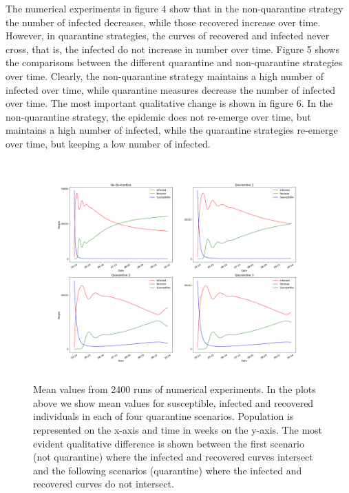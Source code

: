 \documentclass[11pt,a4paper,reqno]{amsart}
\theoremstyle{definition}
\theoremstyle{remark}
\begin{document}
The numerical experiments in figure 4 show that in the non-quarantine strategy the number of infected decreases, while those recovered increase over time. However, in quarantine strategies, the curves of recovered and infected never cross, that is, the infected do not increase in number over time. Figure 5 shows the comparisons between the different quarantine and non-quarantine strategies over time. Clearly, the non-quarantine strategy maintains a high number of infected over time, while quarantine measures decrease the number of infected over time. The most important qualitative change is shown in figure 6. In the non-quarantine strategy, the epidemic does not re-emerge over time, but maintains a high number of infected, while the quarantine strategies re-emerge over time, but keeping a low number of infected.
\begin{figure}[H]
\includegraphics[width=\textwidth]{Dynamics.png}
\caption{Mean values from 2400 runs of numerical experiments. In the plots above we show mean values for susceptible, infected and recovered individuals in each of four quarantine scenarios. Population is represented on the x-axis and time in weeks on the y-axis. The most evident qualitative difference is shown between the first scenario (not quarantine) where the infected and recovered curves intersect and the following scenarios (quarantine) where the infected and recovered curves do not intersect.}
\end{figure}
\end{document}
